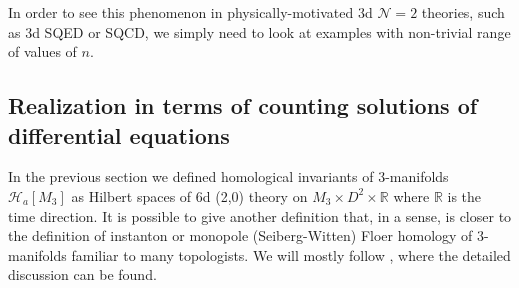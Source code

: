\documentclass[hyper,letterpaper]{JHEP3}
\newcommand{\R}{{\mathbb R}}
\def\CH{{\mathcal H}}
\def\CN{{\mathcal N}}
\begin{document}
In order to see this phenomenon in physically-motivated 3d $\CN=2$ theories, such as 3d SQED or SQCD,
we simply need to look at examples with non-trivial range of values of $n$.


\subsection{Realization in terms of counting solutions of differential equations}

In the previous section we defined homological invariants of 3-manifolds $\CH_a[M_3]$ as Hilbert spaces of 6d (2,0) theory on $M_3\times D^2\times \R$ where $\R$ is the time direction. It is possible to give another definition that, in a sense, is closer to the definition of instanton \cite{MR956166} or monopole (Seiberg-Witten) Floer homology of 3-manifolds \cite{kronheimer2007monopoles} familiar to many topologists. We will mostly follow \cite{Witten:2011zz}, where the detailed discussion can be found.
\end{document}
